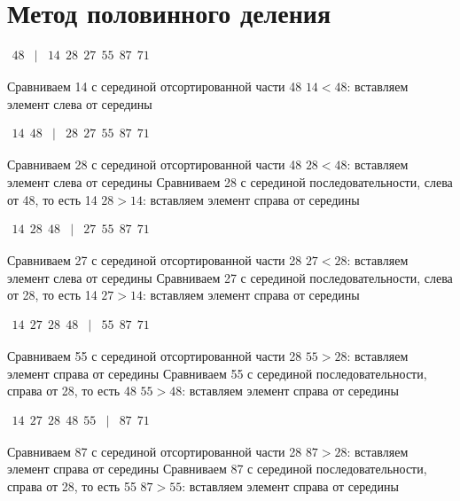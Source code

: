 \documentclass{article}
\begin{document}
\section*{Метод половинного деления}
$\begin{array}{rcl} 48 & | & 14 ~~ 28 ~~ 27 ~~ 55 ~~ 87 ~~ 71 \end{array}$

Сравниваем 14 с серединой отсортированной части 48 \newline
$14 < 48$: вставляем элемент слева от середины

$\begin{array}{rcl} 14 ~~ 48 & | & 28 ~~ 27 ~~ 55 ~~ 87 ~~ 71 \end{array}$

Сравниваем 28 с серединой отсортированной части 48 \newline
$28 < 48$: вставляем элемент слева от середины \newline
Сравниваем 28 с серединой последовательности, слева от 48, то есть 14 \newline
$28 > 14$: вставляем элемент справа от середины

$\begin{array}{rcl} 14 ~~ 28 ~~ 48 & | & 27 ~~ 55 ~~ 87 ~~ 71 \end{array}$

Сравниваем 27 с серединой отсортированной части 28 \newline
$27 < 28$: вставляем элемент слева от середины \newline
Сравниваем 27 с серединой последовательности, слева от 28, то есть 14 \newline
$27 > 14$: вставляем элемент справа от середины

$\begin{array}{rcl} 14 ~~ 27 ~~ 28 ~~ 48 & | & 55 ~~ 87 ~~ 71 \end{array}$

Сравниваем 55 с серединой отсортированной части 28 \newline
$55 > 28$: вставляем элемент справа от середины \newline
Сравниваем 55 с серединой последовательности, справа от 28, то есть 48 \newline
$55 > 48$: вставляем элемент справа от середины

$\begin{array}{rcl} 14 ~~ 27 ~~ 28 ~~ 48 ~~ 55 & | & 87 ~~ 71 \end{array}$

Сравниваем 87 с серединой отсортированной части 28 \newline
$87 > 28$: вставляем элемент справа от середины \newline
Сравниваем 87 с серединой последовательности, справа от 28, то есть 55 \newline
$87 > 55$: вставляем элемент справа от середины
\end{document}
